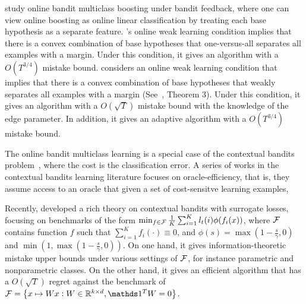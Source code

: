 \cite{Chen-Lin-Lu-2014, Zhang-Jung-Tewari-2018} study online bandit multiclass
boosting under bandit feedback, where one can view online boosting as online
linear classification by treating each base hypothesis as a separate feature.
\cite{Chen-Lin-Lu-2014}'s online weak learning condition implies that there is a
convex combination of base hypotheses that one-versus-all separates all examples
with a margin. Under this condition, it gives an algorithm with a $O(T^{3/4})$
mistake bound. \cite{Zhang-Jung-Tewari-2018} considers an online weak learning
condition that implies that there is a convex combination of base hypotheses
that weakly separates all examples with a margin
(See~\cite{Mukherjee-Schapire-2013}, Theorem 3). Under this condition, it gives
an algorithm with a $O(\sqrt{T})$ mistake bound with the knowledge of the edge
parameter. In addition, it gives an adaptive algorithm with a $O(T^{3/4})$
mistake bound.

The online bandit multiclass learning is a special case of the contextual bandits
problem~\cite{Auer-2003, Langford-Zhang-2007}, where the cost is the classification error.
A series of works in the contextual bandits learning literature focuses on
oracle-efficiency, that is, they assume access to an
oracle that given a set of cost-sensitve learning examples,



Recently, \cite{Foster-Krishnamurthy-2018} developed a rich theory on contextual bandits
with surrogate losses, focusing on benchmarks of the form $\min_{f \in \mathcal{F}}
\frac{1}{K} \sum_{i=1}^K l_t(i) \phi( f_i(x) )$, where $\mathcal{F}$ contains function $f$
such that $\sum_{i=1}^K f_i(\cdot) \equiv 0$, and $\phi(s) = \max(1 - \frac s
\gamma, 0)$ and $\min(1, \max(1 - \frac s \gamma, 0))$. On one hand, it gives
information-theoretic mistake upper bounds under various settings of $\mathcal{F}$,
for instance parametric and nonparametric classes. On the other hand, it gives
an efficient algorithm that has a $O(\sqrt{T})$ regret against the benchmark of
$\calF = \cbr{x \mapsto W x: W \in \R^{k \times d}, \one^T W = 0}$.


